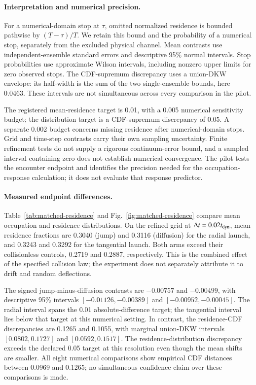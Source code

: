 \documentclass[aps,prd,reprint,amsmath,amssymb,superscriptaddress,nofootinbib,longbibliography,floatfix]{revtex4-2}
\begin{document}
\paragraph{Interpretation and numerical precision.}
For a numerical-domain stop at $\tau$, omitted normalized residence is bounded pathwise by $(T-\tau)/T$. We retain this bound and the probability of a numerical stop, separately from the excluded physical channel. Mean contrasts use independent-ensemble standard errors and descriptive 95\% normal intervals. Stop probabilities use approximate Wilson intervals, including nonzero upper limits for zero observed stops. The CDF-supremum discrepancy uses a union-DKW envelope: its half-width is the sum of the two single-ensemble bounds, here 0.0463. These intervals are not simultaneous across every comparison in the pilot.

The registered mean-residence target is 0.01, with a 0.005 numerical sensitivity budget; the distribution target is a CDF-supremum discrepancy of 0.05. A separate 0.002 budget concerns missing residence after numerical-domain stops. Grid and time-step contrasts carry their own sampling uncertainty. Finite refinement tests do not supply a rigorous continuum-error bound, and a sampled interval containing zero does not establish numerical convergence. The pilot tests the encounter endpoint and identifies the precision needed for the occupation-response calculation; it does not evaluate that response predictor.

\paragraph{Measured endpoint differences.}
Table~\ref{tab:matched-residence} and Fig.~\ref{fig:matched-residence} compare mean occupation and residence distributions. On the refined grid at $\Delta t=0.02t_{\rm dyn}$, mean residence fractions are 0.3040 (jump) and 0.3116 (diffusion) for the radial launch, and 0.3243 and 0.3292 for the tangential launch. Both arms exceed their collisionless controls, 0.2719 and 0.2887, respectively. This is the combined effect of the specified collision law; the experiment does not separately attribute it to drift and random deflections.

The signed jump-minus-diffusion contrasts are $-0.00757$ and $-0.00499$, with descriptive 95\% intervals $[-0.01126,-0.00389]$ and $[-0.00952,-0.00045]$. The radial interval spans the 0.01 absolute-difference target; the tangential interval lies below that target at this numerical setting. In contrast, the residence-CDF discrepancies are 0.1265 and 0.1055, with marginal union-DKW intervals $[0.0802,0.1727]$ and $[0.0592,0.1517]$. The residence-distribution discrepancy exceeds the declared 0.05 target at this resolution even though the mean shifts are smaller. All eight numerical comparisons show empirical CDF distances between 0.0969 and 0.1265; no simultaneous confidence claim over these comparisons is made.
\end{document}
